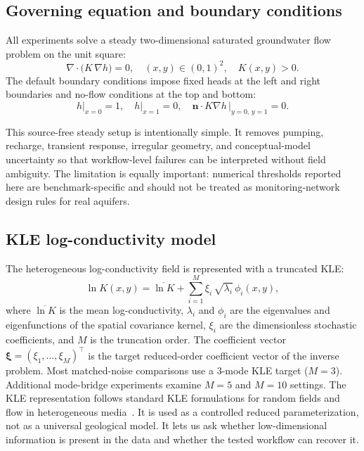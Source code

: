 \documentclass[pdflatex,sn-mathphys,Numbered,iicol]{sn-jnl}
\newcommand{\logK}{\ln K}
\newcommand{\bxi}{\boldsymbol{\xi}}
\begin{document}
\subsection{Governing equation and boundary conditions}
\label{sec:pde}

All experiments solve a steady two-dimensional saturated groundwater flow
problem on the unit square:
\begin{equation}
  \nabla \cdot \bigl( K \, \nabla h \bigr) = 0, \quad (x,y) \in (0,1)^2, \quad K(x,y) > 0.
  \label{eq:pde}
\end{equation}
The default boundary conditions impose fixed heads at the left and right
boundaries and no-flow conditions at the top and bottom:
\begin{equation}
  h\big|_{x=0} = 1, \quad h\big|_{x=1} = 0, \quad
  \mathbf{n} \cdot K \nabla h \,\big|_{y=0,\,y=1} = 0.
  \label{eq:bc}
\end{equation}

This source-free steady setup is intentionally simple. It removes pumping,
recharge, transient response, irregular geometry, and conceptual-model
uncertainty so that workflow-level failures can be interpreted without field
ambiguity. The limitation is equally important: numerical thresholds reported
here are benchmark-specific and should not be treated as monitoring-network
design rules for real aquifers.

\subsection{KLE log-conductivity model}
\label{sec:kle}

The heterogeneous log-conductivity field is represented with a truncated KLE:
\begin{equation}
  \logK(x, y) = \overline{\logK}
    + \sum_{i=1}^{M} \xi_i \, \sqrt{\lambda_i} \, \phi_i(x, y),
  \label{eq:kle}
\end{equation}
where $\overline{\logK}$ is the mean log-conductivity, $\lambda_i$ and
$\phi_i$ are the eigenvalues and eigenfunctions of the spatial covariance
kernel, $\xi_i$ are the dimensionless stochastic coefficients, and $M$ is
the truncation order. The coefficient vector
$\bxi = (\xi_1, \ldots, \xi_M)^\top$ is the target reduced-order coefficient
vector of the inverse problem.
Most matched-noise comparisons use a 3-mode KLE target ($M=3$). Additional
mode-bridge experiments examine $M=5$ and $M=10$ settings. The KLE
representation follows standard KLE formulations for random fields and flow in
heterogeneous media~\cite{ghanem1991stochastic, zhang2004efficient,
lu2004conditional}. It is used as a controlled reduced parameterization, not as
a universal geological model. It lets us ask whether low-dimensional
information is present in the data and whether the tested workflow can recover
it.
\end{document}
